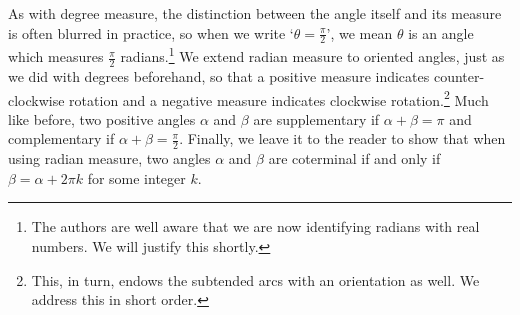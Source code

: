 \documentclass{ximera}
\begin{document}
As with degree measure, the distinction between the angle itself and its measure is often blurred in practice, so when we write  `$\theta = \frac{\pi}{2}$', we mean $\theta$ is an angle which measures $\frac{\pi}{2}$ radians.\footnote{The authors are well aware that we are now identifying radians with real numbers.  We will justify this shortly.} We extend radian measure to oriented angles, just as we did with degrees beforehand, so that a positive measure indicates counter-clockwise rotation and a negative measure indicates clockwise rotation.\footnote{This, in turn, endows the subtended arcs with an orientation as well.  We address this in short order.}  Much like before, two positive angles $\alpha$ and $\beta$ are supplementary if $\alpha + \beta = \pi$ and complementary if $\alpha + \beta = \frac{\pi}{2}$.   Finally, we leave it to the reader to show that when using radian measure, two angles $\alpha$ and $\beta$ are coterminal if and only if $\beta = \alpha + 2\pi k$ for some integer $k$. 
\end{document}
